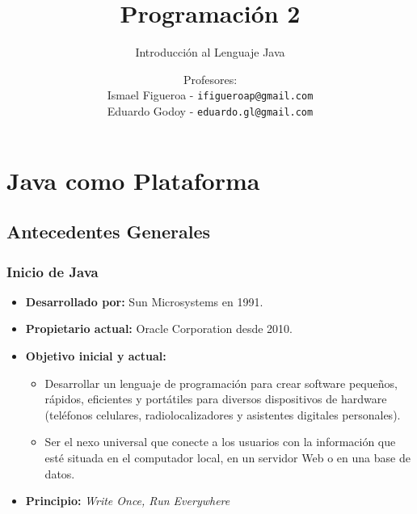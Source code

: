 \documentclass{beamer}
\title[\textbf{Programación 2}]{\textbf{Programación 2}}
\subtitle{Introducción al Lenguaje Java}
\author[IF-EG]
{
  Profesores:\\
  Ismael Figueroa -  \texttt{\small ifigueroap@gmail.com}\\
  \vspace{0.5mm}
  Eduardo Godoy - \texttt{\small eduardo.gl@gmail.com}
}
\institute[Universidad de Valparaíso]
\date{}
\begin{document}
\begin{frame}
  \titlepage
\end{frame}

\section{Java como Plataforma}

\subsection{Antecedentes Generales}

\begin{frame}
  \frametitle{Inicio de Java}

    \begin{itemize}
    \item \textbf{Desarrollado por:} Sun Microsystems en 1991.
    \item \textbf{Propietario actual:} Oracle Corporation desde 2010.
    \item \textbf{Objetivo inicial y actual:}
      
      \begin{itemize}
      \item Desarrollar un lenguaje de programación para crear
        software peque\~nos, rápidos, eficientes y portátiles para
        diversos dispositivos de hardware (teléfonos celulares,
        radiolocalizadores y asistentes digitales personales).
        
      \item Ser el nexo universal que conecte a los usuarios con la
        información que esté situada en el computador local, en un
        servidor Web o en una base de datos.
      \end{itemize}
      
    \item \textbf{Principio:} \emph{Write Once, Run Everywhere}
      
    \end{itemize}    

\end{frame}
\end{document}
